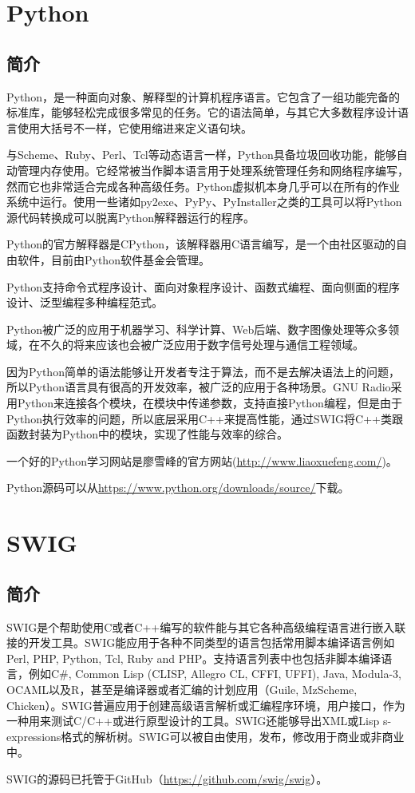 	\section{Python}
		\subsection{简介}
			\par Python，是一种面向对象、解释型的计算机程序语言。它包含了一组功能完备的标准库，能够轻松完成很多常见的任务。它的语法简单，与其它大多数程序设计语言使用大括号不一样，它使用缩进来定义语句块。
			\par 与Scheme、Ruby、Perl、Tcl等动态语言一样，Python具备垃圾回收功能，能够自动管理内存使用。它经常被当作脚本语言用于处理系统管理任务和网络程序编写，然而它也非常适合完成各种高级任务。Python虚拟机本身几乎可以在所有的作业系统中运行。使用一些诸如py2exe、PyPy、PyInstaller之类的工具可以将Python源代码转换成可以脱离Python解释器运行的程序。
			\par Python的官方解释器是CPython，该解释器用C语言编写，是一个由社区驱动的自由软件，目前由Python软件基金会管理。
			\par Python支持命令式程序设计、面向对象程序设计、函数式编程、面向侧面的程序设计、泛型编程多种编程范式。\cite{ wiki:Python}
			\par Python被广泛的应用于机器学习、科学计算、Web后端、数字图像处理等众多领域，在不久的将来应该也会被广泛应用于数字信号处理与通信工程领域。
			\par 因为Python简单的语法能够让开发者专注于算法，而不是去解决语法上的问题，所以Python语言具有很高的开发效率，被广泛的应用于各种场景。GNU Radio采用Python来连接各个模块，在模块中传递参数，支持直接Python编程，但是由于Python执行效率的问题，所以底层采用C++来提高性能，通过SWIG将C++类跟函数封装为Python中的模块，实现了性能与效率的综合。
			\par 一个好的Python学习网站是廖雪峰的官方网站(\href{http://www.liaoxuefeng.com/}{http://www.liaoxuefeng.com/})。
			\par Python源码可以从\href{https://www.python.org/downloads/source/}{https://www.python.org/downloads/source/}下载。
	\section{SWIG}
		\subsection{简介}
			\par SWIG是个帮助使用C或者C++编写的软件能与其它各种高级编程语言进行嵌入联接的开发工具。SWIG能应用于各种不同类型的语言包括常用脚本编译语言例如Perl, PHP, Python, Tcl, Ruby and PHP。支持语言列表中也包括非脚本编译语言，例如C\#, Common Lisp (CLISP, Allegro CL, CFFI, UFFI), Java, Modula-3, OCAML以及R，甚至是编译器或者汇编的计划应用（Guile, MzScheme, Chicken）。SWIG普遍应用于创建高级语言解析或汇编程序环境，用户接口，作为一种用来测试C/C++或进行原型设计的工具。SWIG还能够导出XML或Lisp s-expressions格式的解析树。SWIG可以被自由使用，发布，修改用于商业或非商业中。\cite{ wiki:SWIG}
			\par SWIG的源码已托管于GitHub（\href{https://github.com/swig/swig}{https://github.com/swig/swig}）。
